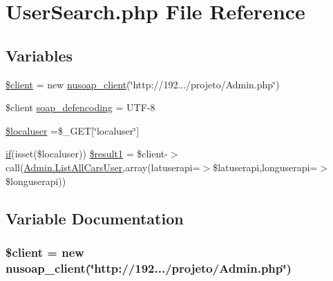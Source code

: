 \hypertarget{_user_search_8php}{}\section{User\+Search.\+php File Reference}
\label{_user_search_8php}
\subsection*{Variables}
\begin{DoxyCompactItemize}
\item 
\hyperlink{_user_search_8php_ad1405dc1ba2e288764378e79bff7a87d}{\$client} = new \hyperlink{classnusoap__client}{nusoap\+\_\+client}(\char`\"{}http\+://192.../projeto/Admin.\+php\char`\"{})
\item 
\$client \hyperlink{_user_search_8php_a944cce1b9c1aa5e93c77ace20ce99989}{soap\+\_\+defencoding} = \textquotesingle{}U\+T\+F-\/8\textquotesingle{}
\item 
\hyperlink{_user_search_8php_a9af1c877a1e07b9c9a05a716088d9ee9}{\$localuser} =\$\+\_\+\+G\+E\+T\mbox{[}\char`\"{}localuser\char`\"{}\mbox{]}
\item 
\hyperlink{_viagem_8php_a88cb244e17cabaf4dee5fb3acb8168e0}{if}(isset(\$localuser)) \hyperlink{_user_search_8php_a4f9e1bf408dc2a45246e566d5696ce64}{\$result1} = \$client-\/$>$call(\textquotesingle{}\hyperlink{class_admin_a095a288cff96d3cf09569c174f5e0dc0}{Admin.\+List\+All\+Cars\+User}\textquotesingle{},array(\textquotesingle{}latuserapi\textquotesingle{}=$>$\$latuserapi,\textquotesingle{}longuserapi\textquotesingle{}=$>$\$longuserapi))
\end{DoxyCompactItemize}


\subsection{Variable Documentation}
\hypertarget{_user_search_8php_ad1405dc1ba2e288764378e79bff7a87d}{}
\subsubsection[{\$client}]{\setlength{\rightskip}{0pt plus 5cm}\$client = new {\bf nusoap\+\_\+client}(\char`\"{}http\+://192.../projeto/Admin.\+php\char`\"{})}\label{_user_search_8php_ad1405dc1ba2e288764378e79bff7a87d}
\hypertarget{_user_search_8php_a9af1c877a1e07b9c9a05a716088d9ee9}{}
